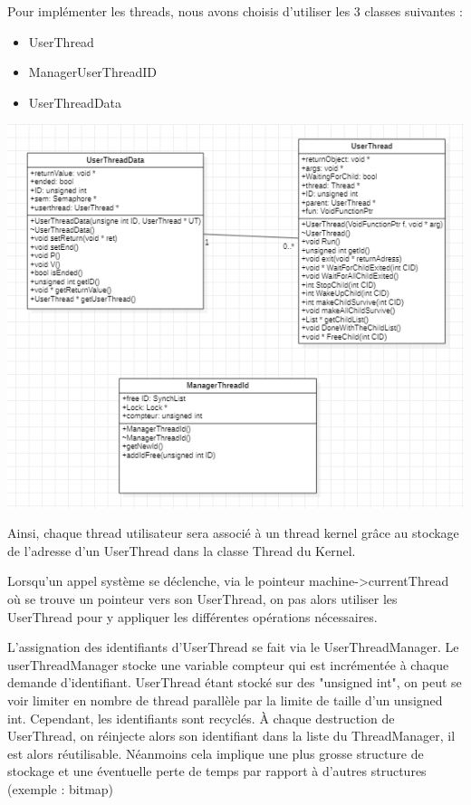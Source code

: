 \documentclass{article}
\begin{document}
Pour implémenter les threads, nous avons choisis d'utiliser les 3 classes suivantes :
\begin{itemize}
\item
UserThread
\item
ManagerUserThreadID
\item
UserThreadData
\end{itemize}
\includegraphics{code/userprog/UserThread.PNG}

Ainsi, chaque thread utilisateur sera associé à un thread kernel grâce au stockage de l'adresse d'un UserThread dans la classe Thread du Kernel.


Lorsqu'un appel système se déclenche, via le pointeur machine->currentThread où se trouve un pointeur vers son UserThread, on pas alors utiliser les UserThread pour y appliquer les différentes opérations nécessaires.
\vspace{5mm}

L'assignation des identifiants d'UserThread se fait via le UserThreadManager. Le userThreadManager stocke une variable compteur qui est incrémentée à chaque demande d'identifiant. UserThread étant stocké sur des "unsigned int", on peut se voir limiter en nombre de thread parallèle par la limite de taille d'un unsigned int. Cependant, les identifiants sont recyclés. À chaque destruction de UserThread, on réinjecte alors son identifiant dans la liste du ThreadManager, il est alors réutilisable. Néanmoins cela implique une plus grosse structure de stockage et une éventuelle perte de temps par rapport à d'autres structures (exemple : bitmap)
\end{document}
